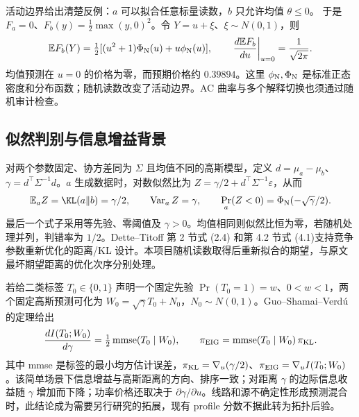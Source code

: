 活动边界给出清楚反例：$a$ 可以拟合任意标量读数，$b$ 只允许均值 $\theta\le0$。
于是 $F_a=0$、$F_b(y)=\tfrac12\max(y,0)^2$。令 $Y=u+\xi$、$\xi\sim N(0,1)$，则
\begin{equation}
\mathbb EF_b(Y)=\tfrac12[(u^2+1)\Phi_{\rm N}(u)+u\phi_{\rm N}(u)],\qquad
\left.\frac{d\mathbb EF_b}{du}\right|_{u=0}=\frac1{\sqrt{2\pi}}.
\label{eq:gp-boundary}
\end{equation}
均值预测在 $u=0$ 的价格为零，而预期价格约 $0.39894$。这里 $\phi_{\rm N},\Phi_{\rm N}$ 是标准正态密度和分布函数；随机读数改变了活动边界。AC 曲率与多个解释切换也须通过随机审计检查。

\subsection{似然判别与信息增益背景}
对两个参数固定、协方差同为 $\Sigma$ 且均值不同的高斯模型，定义
$d=\mu_a-\mu_b$、$\gamma=d^\top\Sigma^{-1}d$。$a$ 生成数据时，对数似然比为
$Z=\gamma/2+d^\top\Sigma^{-1}\varepsilon$，从而
\begin{equation}
\mathbb E_aZ=\KL(a\Vert b)=\gamma/2,\qquad
\operatorname{Var}_aZ=\gamma,\qquad
\Pr_a(Z<0)=\Phi_{\rm N}(-\sqrt\gamma/2).
\label{eq:gp-gaussian}
\end{equation}
最后一个式子采用等先验、零阈值及 $\gamma>0$。均值相同则似然比恒为零，若随机处理并列，判错率为 $1/2$。Dette--Titoff 第 2 节式 (2.4) 和第 4.2 节式 (4.1)支持竞争参数重新优化的距离/KL 设计\cite{dette}。本项目随机读数取得后重新拟合的期望，与原文最坏期望距离的优化次序分别处理。

若给二类标签 $T_0\in\{0,1\}$ 声明一个固定先验 $\Pr(T_0=1)=w$、$0<w<1$，两个固定高斯预测可化为
$W_0=\sqrt\gamma T_0+N_0$，$N_0\sim N(0,1)$。Guo--Shamai--Verd\'u 的定理\cite{gp-guo}给出
\begin{equation}
\frac{d I(T_0;W_0)}{d\gamma}=\tfrac12\operatorname{mmse}(T_0\mid W_0),
\qquad
\pi_{\rm EIG}=\operatorname{mmse}(T_0\mid W_0)\,\pi_{\rm KL}.
\label{eq:gp-immse}
\end{equation}
其中 mmse 是标签的最小均方估计误差，$\pi_{\rm KL}=\nabla_u(\gamma/2)$、$\pi_{\rm EIG}=\nabla_u I(T_0;W_0)$。该简单场景下信息增益与高斯距离的方向、排序一致；对距离 $\gamma$ 的边际信息收益随 $\gamma$ 增加而下降；功率价格还取决于 $\partial\gamma/\partial u$。线路和源不确定性形成预测混合时，此结论成为需要另行研究的拓展，现有 profile 分数不据此转为拓扑后验。


